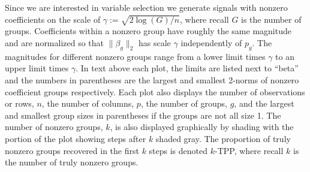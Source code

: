 \documentclass{imsart}
\begin{document}
Since we are interested in variable selection we generate signals with
nonzero coefficients on the scale of $\gamma := \sqrt{2 \log(G)/n}$,
where recall $G$ is the number of groups.
Coefficients within a
nonzero group have roughly the same magnitude and are normalized
so that $\| \beta_g \|_2$ has scale $\gamma$ independently of $p_g$.
The magnitudes for different
nonzero groups range from a lower limit times $\gamma$ to an upper
limit times $\gamma$. In text above each plot, the limits are listed
next to ``beta'' and the numbers in parentheses are the largest
and smallest 2-norms of nonzero coefficient groups respectively.
Each plot also displays the
number of observations or rows, $n$, the number of columns, $p$, the
number of groups, $g$, and the largest and smallest group sizes in
parentheses if the groups are not all size 1. The number of nonzero
groups, $k$, is also displayed graphically by shading with the portion
of the plot showing steps after $k$ shaded gray.
The proportion of truly
nonzero groups recovered in the first $k$ steps is denoted $k$-TPP,
where recall $k$ is the number of truly nonzero groups. 
\end{document}
